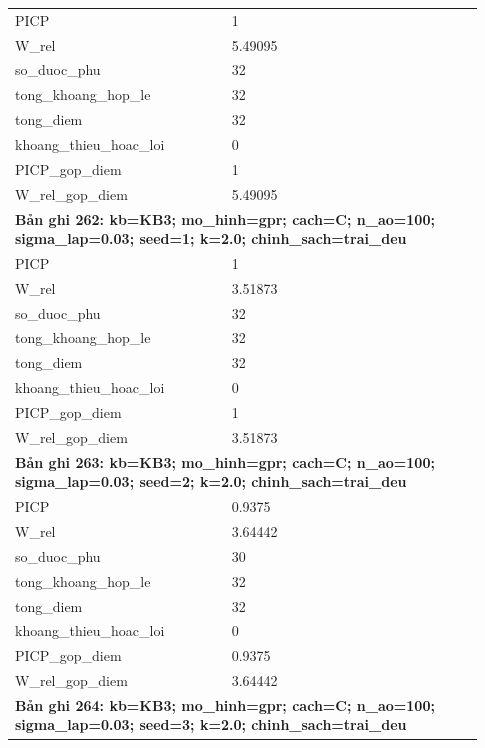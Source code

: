 \begin{longtable}{p{0.43\linewidth}p{0.50\linewidth}}
PICP & 1 \\
W\_\allowbreak rel & 5.49095 \\
so\_\allowbreak duoc\_\allowbreak phu & 32 \\
tong\_\allowbreak khoang\_\allowbreak hop\_\allowbreak le & 32 \\
tong\_\allowbreak diem & 32 \\
khoang\_\allowbreak thieu\_\allowbreak hoac\_\allowbreak loi & 0 \\
PICP\_\allowbreak gop\_\allowbreak diem & 1 \\
W\_\allowbreak rel\_\allowbreak gop\_\allowbreak diem & 5.49095 \\
\midrule
\multicolumn{2}{p{0.95\linewidth}}{\textbf{Bản ghi 262: kb=KB3; mo\_hinh=gpr; cach=C; n\_ao=100; sigma\_lap=0.03; seed=1; k=2.0; chinh\_sach=trai\_deu}} \\
PICP & 1 \\
W\_\allowbreak rel & 3.51873 \\
so\_\allowbreak duoc\_\allowbreak phu & 32 \\
tong\_\allowbreak khoang\_\allowbreak hop\_\allowbreak le & 32 \\
tong\_\allowbreak diem & 32 \\
khoang\_\allowbreak thieu\_\allowbreak hoac\_\allowbreak loi & 0 \\
PICP\_\allowbreak gop\_\allowbreak diem & 1 \\
W\_\allowbreak rel\_\allowbreak gop\_\allowbreak diem & 3.51873 \\
\midrule
\multicolumn{2}{p{0.95\linewidth}}{\textbf{Bản ghi 263: kb=KB3; mo\_hinh=gpr; cach=C; n\_ao=100; sigma\_lap=0.03; seed=2; k=2.0; chinh\_sach=trai\_deu}} \\
PICP & 0.9375 \\
W\_\allowbreak rel & 3.64442 \\
so\_\allowbreak duoc\_\allowbreak phu & 30 \\
tong\_\allowbreak khoang\_\allowbreak hop\_\allowbreak le & 32 \\
tong\_\allowbreak diem & 32 \\
khoang\_\allowbreak thieu\_\allowbreak hoac\_\allowbreak loi & 0 \\
PICP\_\allowbreak gop\_\allowbreak diem & 0.9375 \\
W\_\allowbreak rel\_\allowbreak gop\_\allowbreak diem & 3.64442 \\
\midrule
\multicolumn{2}{p{0.95\linewidth}}{\textbf{Bản ghi 264: kb=KB3; mo\_hinh=gpr; cach=C; n\_ao=100; sigma\_lap=0.03; seed=3; k=2.0; chinh\_sach=trai\_deu}} \\

\end{longtable}
